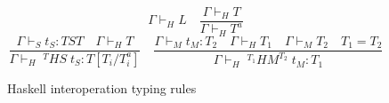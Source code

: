 \begin{figure}
\[
\Gamma\vdash_{H}L
\quad
\frac{\Gamma\vdash_{H}T}{\Gamma\vdash_{H}T^{a}}
\]
\[
\frac{\Gamma\vdash_{S}t_{S}:TST\quad\Gamma\vdash_{H}T}{\Gamma\vdash_{H}\;^{T}HS\;t_{S}:T[T_{i}/T^{a}_{i}]}
\quad
\frac{\Gamma\vdash_{M}t_{M}:T_{2}\quad\Gamma\vdash_{H}T_{1}\quad\Gamma\vdash_{M}T_{2}\quad T_{1}=T_{2}}{\Gamma\vdash_{H}\;^{T_{1}}HM^{T_{2}}\;t_{M}:T_{1}}
\]
\caption{Haskell interoperation typing rules}
\label{hitr}
\end{figure}